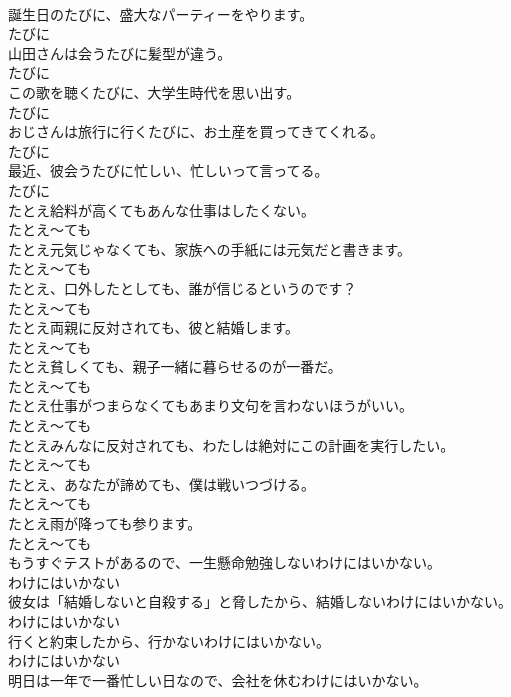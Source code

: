 \documentclass[8pt]{extreport}
\begin{document}
\begin{CJK}{UTF8}{min}
\\	誕生日のたびに、盛大なパーティーをやります。	
\\	たびに
\\	山田さんは会うたびに髪型が違う。	
\\	たびに
\\	この歌を聴くたびに、大学生時代を思い出す。	
\\	たびに
\\	おじさんは旅行に行くたびに、お土産を買ってきてくれる。	
\\	たびに
\\	最近、彼会うたびに忙しい、忙しいって言ってる。	
\\	たびに
\\	たとえ給料が高くてもあんな仕事はしたくない。	
\\	たとえ～ても
\\	たとえ元気じゃなくても、家族への手紙には元気だと書きます。	
\\	たとえ～ても
\\	たとえ、口外したとしても、誰が信じるというのです？	
\\	たとえ～ても
\\	たとえ両親に反対されても、彼と結婚します。	
\\	たとえ～ても
\\	たとえ貧しくても、親子一緒に暮らせるのが一番だ。	
\\	たとえ～ても
\\	たとえ仕事がつまらなくてもあまり文句を言わないほうがいい。	
\\	たとえ～ても
\\	たとえみんなに反対されても、わたしは絶対にこの計画を実行したい。	
\\	たとえ～ても
\\	たとえ、あなたが諦めても、僕は戦いつづける。	
\\	たとえ～ても
\\	たとえ雨が降っても参ります。	
\\	たとえ～ても
\\	もうすぐテストがあるので、一生懸命勉強しないわけにはいかない。	
\\	わけにはいかない
\\	彼女は「結婚しないと自殺する」と脅したから、結婚しないわけにはいかない。	
\\	わけにはいかない
\\	行くと約束したから、行かないわけにはいかない。	
\\	わけにはいかない
\\	明日は一年で一番忙しい日なので、会社を休むわけにはいかない。	

\end{CJK}
\end{document}
